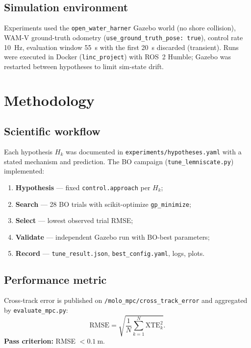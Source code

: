 \documentclass[11pt,a4paper]{article}
\begin{document}
\subsection{Simulation environment}

Experiments used the \texttt{open\_water\_harner} Gazebo world (no shore collision),
WAM-V ground-truth odometry (\texttt{use\_ground\_truth\_pose: true}), control rate
\SI{10}{\hertz}, evaluation window \SI{55}{\second} with the first \SI{20}{\second} discarded
(transient). Runs were executed in Docker (\texttt{linc\_project}) with ROS~2 Humble; Gazebo
was restarted between hypotheses to limit sim-state drift.

\section{Methodology}
\label{sec:method}

\subsection{Scientific workflow}

Each hypothesis $H_k$ was documented in \texttt{experiments/hypotheses.yaml} with a stated
mechanism and prediction. The BO campaign (\texttt{tune\_lemniscate.py}) implemented:
\begin{enumerate}[noitemsep]
  \item \textbf{Hypothesis} --- fixed \texttt{control.approach} per $H_k$;
  \item \textbf{Search} --- 28 BO trials with scikit-optimize \texttt{gp\_minimize};
  \item \textbf{Select} --- lowest observed trial RMSE;
  \item \textbf{Validate} --- independent Gazebo run with BO-best parameters;
  \item \textbf{Record} --- \texttt{tune\_result.json}, \texttt{best\_config.yaml}, logs, plots.
\end{enumerate}

\subsection{Performance metric}

Cross-track error is published on \texttt{/molo\_mpc/cross\_track\_error} and aggregated by
\texttt{evaluate\_mpc.py}:
\[
  \mathrm{RMSE} = \sqrt{\frac{1}{N}\sum_{k=1}^{N} \mathrm{XTE}_k^2}.
\]
\textbf{Pass criterion:} RMSE $< \SI{0.1}{\meter}$.
\end{document}
